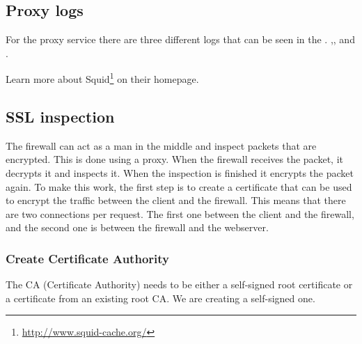 \subsection{Proxy logs}
For the proxy service there are three different logs that can be seen in the . ,, and .


Learn more about Squid\footnote{\url{http://www.squid-cache.org/}} on their homepage.

\subsection{SSL inspection}
The firewall can act as a man in the middle and inspect packets that are encrypted. This is done using a proxy. When the firewall receives the packet, it decrypts it and inspects it. When the inspection is finished it encrypts the packet again. To make this work, the first step is to create a certificate that can be used to encrypt the traffic between the client and the firewall. This means that there are two connections per request. The first one between the client and the firewall, and the second one is between the firewall and the webserver.

\subsubsection{Create Certificate Authority} \label{create_ca}
The CA (Certificate Authority) needs to be either a self-signed root certificate or a certificate from an existing root CA. We are creating a self-signed one.
 
